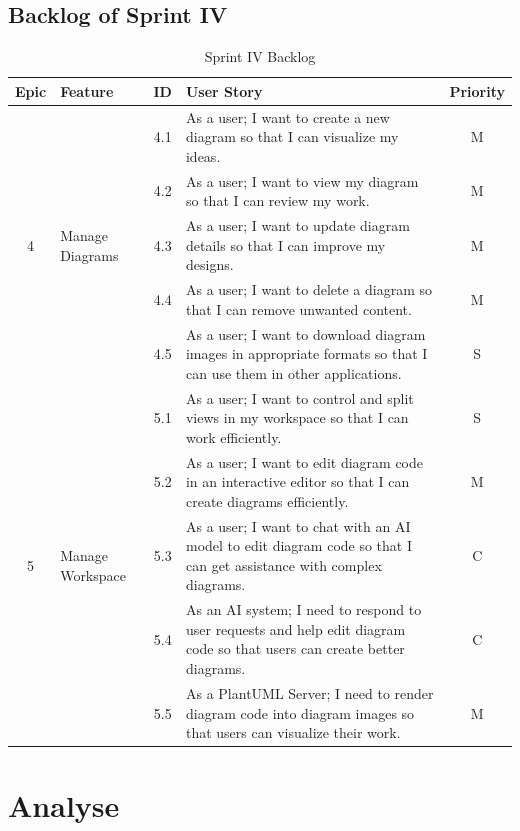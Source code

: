 \subsection{Backlog of Sprint IV}
\begin{table}[H]
\centering
\caption{Sprint IV Backlog}
\begin{tabular}{|c|l|c|l|c|}
\hline
\textbf{Epic} & \textbf{Feature} & \textbf{ID} & \textbf{User Story} & \textbf{Priority} \\
\hline
\multirow{5}{*}{4} & \multirow{5}{*}{Manage Diagrams} & 4.1 & As a user; I want to create a new diagram so that I can visualize my ideas. & M \\
\cline{3-5}
& & 4.2 & As a user; I want to view my diagram so that I can review my work. & M \\
\cline{3-5}
& & 4.3 & As a user; I want to update diagram details so that I can improve my designs. & M \\
\cline{3-5}
& & 4.4 & As a user; I want to delete a diagram so that I can remove unwanted content. & M \\
\cline{3-5}
& & 4.5 & As a user; I want to download diagram images in appropriate formats so that I can use them in other applications. & S \\
\hline
\multirow{5}{*}{5} & \multirow{5}{*}{Manage Workspace} & 5.1 & As a user; I want to control and split views in my workspace so that I can work efficiently. & S \\
\cline{3-5}
& & 5.2 & As a user; I want to edit diagram code in an interactive editor so that I can create diagrams efficiently. & M \\
\cline{3-5}
& & 5.3 & As a user; I want to chat with an AI model to edit diagram code so that I can get assistance with complex diagrams. & C \\
\cline{3-5}
& & 5.4 & As an AI system; I need to respond to user requests and help edit diagram code so that users can create better diagrams. & C \\
\cline{3-5}
& & 5.5 & As a PlantUML Server; I need to render diagram code into diagram images so that users can visualize their work. & M \\
\hline
\end{tabular}
\end{table}

\section{Analyse}

